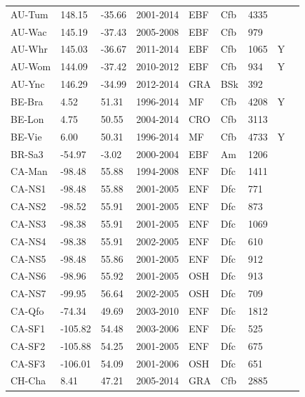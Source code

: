 \documentclass{myreport}
\begin{document}
\begin{longtable}{lllllllll}
  AU-Tum & 148.15 & -35.66 & 2001-2014 & EBF & Cfb & 4335 &  & \cite{AU-Tum} \\ 
  AU-Wac & 145.19 & -37.43 & 2005-2008 & EBF & Cfb & 979 &  & \cite{AU-Wac} \\ 
  AU-Whr & 145.03 & -36.67 & 2011-2014 & EBF & Cfb & 1065 & Y & \cite{AU-Whr} \\ 
  AU-Wom & 144.09 & -37.42 & 2010-2012 & EBF & Cfb & 934 & Y & \cite{AU-Wom} \\ 
  AU-Ync & 146.29 & -34.99 & 2012-2014 & GRA & BSk & 392 &  & \cite{AU-Ync} \\ 
  BE-Bra & 4.52 & 51.31 & 1996-2014 & MF & Cfb & 4208 & Y & \cite{BE-Bra} \\ 
  BE-Lon & 4.75 & 50.55 & 2004-2014 & CRO & Cfb & 3113 &  & \cite{BE-Lon} \\ 
  BE-Vie & 6.00 & 50.31 & 1996-2014 & MF & Cfb & 4733 & Y & \cite{BE-Vie} \\ 
  BR-Sa3 & -54.97 & -3.02 & 2000-2004 & EBF & Am & 1206 &  & \cite{BR-Sa3} \\ 
  CA-Man & -98.48 & 55.88 & 1994-2008 & ENF & Dfc & 1411 &  & \cite{CA-Man} \\ 
  CA-NS1 & -98.48 & 55.88 & 2001-2005 & ENF & Dfc & 771 &  & \cite{CA-NS1} \\ 
  CA-NS2 & -98.52 & 55.91 & 2001-2005 & ENF & Dfc & 873 &  & \cite{CA-NS2} \\ 
  CA-NS3 & -98.38 & 55.91 & 2001-2005 & ENF & Dfc & 1069 &  & \cite{CA-NS3} \\ 
  CA-NS4 & -98.38 & 55.91 & 2002-2005 & ENF & Dfc & 610 &  & \cite{CA-NS4} \\ 
  CA-NS5 & -98.48 & 55.86 & 2001-2005 & ENF & Dfc & 912 &  & \cite{CA-NS5} \\ 
  CA-NS6 & -98.96 & 55.92 & 2001-2005 & OSH & Dfc & 913 &  & \cite{CA-NS6} \\ 
  CA-NS7 & -99.95 & 56.64 & 2002-2005 & OSH & Dfc & 709 &  & \cite{CA-NS7} \\ 
  CA-Qfo & -74.34 & 49.69 & 2003-2010 & ENF & Dfc & 1812 &  & \cite{CA-Qfo} \\ 
  CA-SF1 & -105.82 & 54.48 & 2003-2006 & ENF & Dfc & 525 &  & \cite{CA-SF1} \\ 
  CA-SF2 & -105.88 & 54.25 & 2001-2005 & ENF & Dfc & 675 &  & \cite{CA-SF2} \\ 
  CA-SF3 & -106.01 & 54.09 & 2001-2006 & OSH & Dfc & 651 &  & \cite{CA-SF3} \\ 
  CH-Cha & 8.41 & 47.21 & 2005-2014 & GRA & Cfb & 2885 &  & \cite{CH-Cha} \\ 

\end{longtable}
\end{document}
